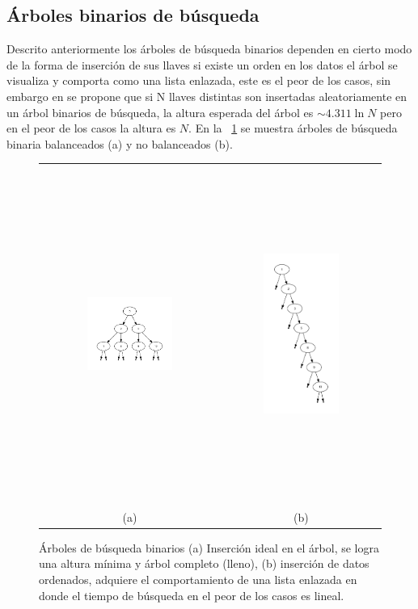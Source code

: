 \documentclass[paper=a4, fontsize=11pt]{scrartcl} %
\numberwithin{equation}{section} %
\numberwithin{figure}{section} %
\numberwithin{table}{section} %
\begin{document}
\subsection{Árboles binarios de búsqueda}
Descrito anteriormente los árboles de búsqueda binarios dependen en cierto modo de la forma de inserción de sus llaves si existe un orden en los datos el árbol se visualiza y comporta como una lista enlazada, este es el peor de los casos, sin embargo en \cite{reed2000} se propone que si N llaves distintas son insertadas aleatoriamente en un árbol binarios de búsqueda, la altura esperada del árbol es $\sim 4.311 \ln N$  pero en el peor de los casos la altura es $N$. En la \figurename~\ref{fig:bst} se muestra árboles de búsqueda binaria balanceados (a) y no balanceados (b).
\begin{figure}[h]
	\begin{tabular}{cc}
		\includegraphics[width=0.5\textwidth,height=5cm]{balanced} & 
		\includegraphics[width=0.5\textwidth,height=11cm]{unbalanced} \\
		(a) & (b)
	\end{tabular}
	\caption{Árboles de búsqueda binarios (a) Inserción ideal en el árbol, se logra una altura mínima y árbol completo (lleno), (b) inserción de datos ordenados, adquiere el comportamiento de una lista enlazada en donde el tiempo de búsqueda en el peor de los casos es lineal.}
	\label{fig:bst}
\end{figure}
\end{document}
